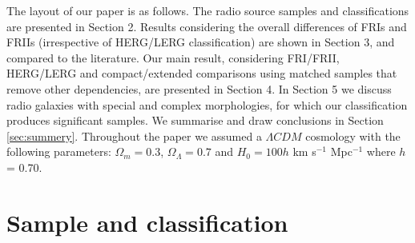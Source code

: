 \documentclass[usenatbib]{mn2e}
\begin{document}
The layout of our paper is as follows. The radio source samples and
classifications are presented in Section 2. Results considering the
overall differences of FRIs and FRIIs (irrespective of HERG/LERG
classification) are shown in Section 3, and compared to the
literature. Our main result, considering FRI/FRII, HERG/LERG and
compact/extended comparisons using matched samples that remove other
dependencies, are presented in Section 4. In Section 5 we discuss radio
galaxies with special and complex morphologies, for which our
classification produces significant samples. We summarise and draw
conclusions in Section \ref{sec:summery}.  Throughout the paper we assumed
a $\Lambda CDM$ cosmology with the following parameters: $\Omega_m=0.3$,
$\Omega_\Lambda=0.7$ and $H_0=100 h$ km s$^{-1}$ Mpc$^{-1}$ where $h$ =
0.70.\\



\section {Sample and classification }
\label{sec:Sample}
\end{document}
